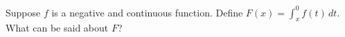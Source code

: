 \documentclass{ximera}
\begin{document}
\begin{problem}
  Suppose $f$ is a negative and continuous function.  Define $F(x) = \int_x^0 f(t) \, dt$.  What can be said about $F$?
  \begin{multipleChoice}
  \end{multipleChoice}
\end{problem}
\end{document}
